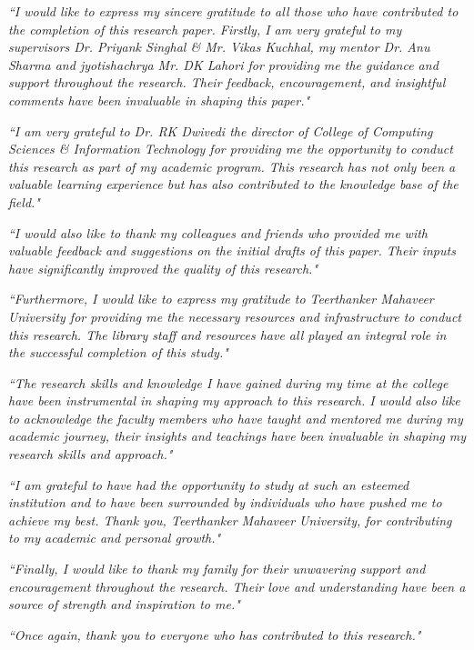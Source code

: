 \textit{``I would like to express my sincere gratitude to all those who have contributed to the completion of this research paper. Firstly, I am very grateful to my supervisors Dr. Priyank Singhal \& Mr. Vikas Kuchhal, my mentor Dr. Anu Sharma and jyotishachrya Mr. DK Lahori for providing me the guidance and support throughout the research. Their feedback, encouragement, and insightful comments have been invaluable in shaping this paper."}

\textit{``I am very grateful to Dr. RK Dwivedi the director of College of Computing Sciences \& Information Technology for providing me the opportunity to conduct this research as part of my academic program. This research has not only been a valuable learning experience but has also contributed to the knowledge base of the field."}

\textit{``I would also like to thank my colleagues and friends who provided me with valuable feedback and suggestions on the initial drafts of this paper. Their inputs have significantly improved the quality of this research."}

\textit{``Furthermore, I would like to express my gratitude to Teerthanker Mahaveer University for providing me the necessary resources and infrastructure to conduct this research. The library staff and resources have all played an integral role in the successful completion of this study."}

\textit{``The research skills and knowledge I have gained during my time at the college have been instrumental in shaping my approach to this research. I would also like to acknowledge the faculty members who have taught and mentored me during my academic journey, their insights and teachings have been invaluable in shaping my research skills and approach."}

\textit{``I am grateful to have had the opportunity to study at such an esteemed institution and to have been surrounded by individuals who have pushed me to achieve my best. Thank you, Teerthanker Mahaveer University, for contributing to my academic and personal growth."}

\textit{``Finally, I would like to thank my family for their unwavering support and encouragement throughout the research. Their love and understanding have been a source of strength and inspiration to me."}

\textit{``Once again, thank you to everyone who has contributed to this research."}
